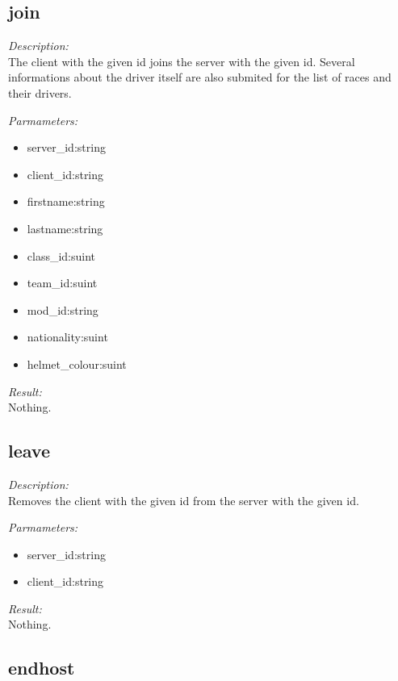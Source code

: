 \subsection{join}

\begin{description}
\item {\it Description:}\\
The client with the given id joins the server with the given id. Several informations about the driver itself are also submited for the list of races and their drivers.
\item {\it Parmameters:}
\begin{itemize}
\item server\_id:string
\item client\_id:string
\item firstname:string
\item lastname:string
\item class\_id:suint
\item team\_id:suint
\item mod\_id:string
\item nationality:suint
\item helmet\_colour:suint
\end{itemize}
\item {\it Result:}\\
Nothing.
\end{description}

\subsection{leave}

\begin{description}
\item {\it Description:}\\
Removes the client with the given id from the server with the given id.
\item {\it Parmameters:}
\begin{itemize}
\item server\_id:string
\item client\_id:string
\end{itemize}
\item {\it Result:}\\
Nothing.
\end{description}

\subsection{endhost}

